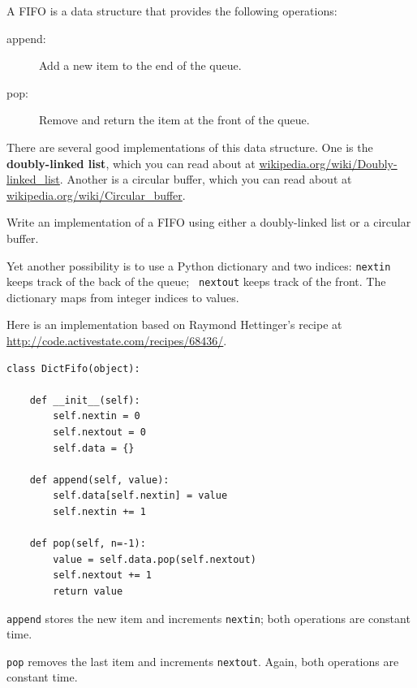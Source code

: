 \documentclass[10pt]{book}
\begin{document}
A FIFO is a data structure that provides the following operations:

\begin{description}

\item[append:] Add a new item to the end of the queue.

\item[pop:] Remove and return the item at the front of the queue.

\end{description}

There are several good implementations of this data structure.
One is the {\bf doubly-linked list}, which
you can read about at \url{wikipedia.org/wiki/Doubly-linked_list}.
Another is a circular buffer, which you can read about at
\url{wikipedia.org/wiki/Circular_buffer}.

\begin{exercise}

Write an implementation of a FIFO using either a doubly-linked
list or a circular buffer.

\end{exercise}

Yet another possibility is to use a Python dictionary and
two indices: {\tt nextin} keeps track of the back of the queue; {\tt
  nextout} keeps track of the front.  The dictionary maps from
integer indices to values.

Here is an implementation based on Raymond Hettinger's recipe
at \url{http://code.activestate.com/recipes/68436/}.

\begin{verbatim}
class DictFifo(object):

    def __init__(self):
        self.nextin = 0
        self.nextout = 0
        self.data = {}

    def append(self, value):
        self.data[self.nextin] = value
        self.nextin += 1

    def pop(self, n=-1):
        value = self.data.pop(self.nextout)
        self.nextout += 1
        return value
\end{verbatim}

{\tt append} stores the new item and increments {\tt nextin};
both operations are constant time.

{\tt pop} removes the last item and increments {\tt nextout}.  Again,
both operations are constant time.
\end{document}
